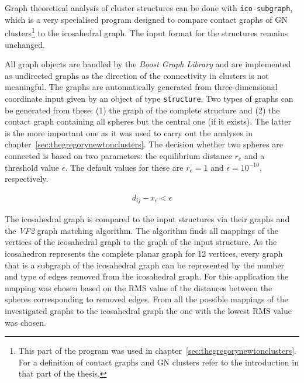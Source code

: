 Graph theoretical analysis of cluster structures can be done with
\verb|ico-subgraph|, which is a very specialised program designed to compare
contact graphs of \ac{GN} clusters\footnote{This part of the program was used in
chapter~\ref{sec:thegregorynewtonclusters}. For a definition of contact graphs
and \ac{GN} clusters refer to the introduction in that part of the thesis.} to
the icosahedral graph. The input format for the structures remains unchanged.

All graph objects are handled by the \textit{Boost Graph
Library}\autocite{Siek_BoostGraphLibrary_2002} and are implemented as undirected
graphs as the direction of the connectivity in clusters is not meaningful. The
graphs are automatically generated from three-dimensional coordinate input given
by an object of type \verb|structure|. Two types of graphs can be generated from
these: (1) the graph of the complete structure and (2) the contact graph
containing all spheres but the central one (if it exists). The latter is the
more important one as it was used to carry out the analyses in
chapter~\ref{sec:thegregorynewtonclusters}. The decision whether two spheres are
connected is based on two parameters: the equilibrium distance $r_e$ and a
threshold value $\epsilon$. The default values for these are $r_e=1$ and
$\epsilon=10^{-10}$, respectively.

\begin{align}
    d_{ij}-r_e < \epsilon
\end{align}

The icosahedral graph is compared to the input structures via their graphs and
the \textit{VF2} graph matching
algorithm.\autocite{Cordella_ImprovedAlgorithmMatching_2001,Cordella_SubGraphIsomorphism_2004}
The algorithm finds all mappings of the vertices of the icosahedral graph to the
graph of the input structure. As the icosahedron represents the complete planar
graph for 12 vertices, every graph that is a subgraph of the icosahedral graph
can be represented by the number and type of edges removed from the icosahedral
graph. For this application the mapping was chosen based on the \ac{RMS} value
of the distances between the spheres corresponding to removed edges. From all
the possible mappings of the investigated graphs to the icosahedral graph the
one with the lowest \ac{RMS} value was chosen.

